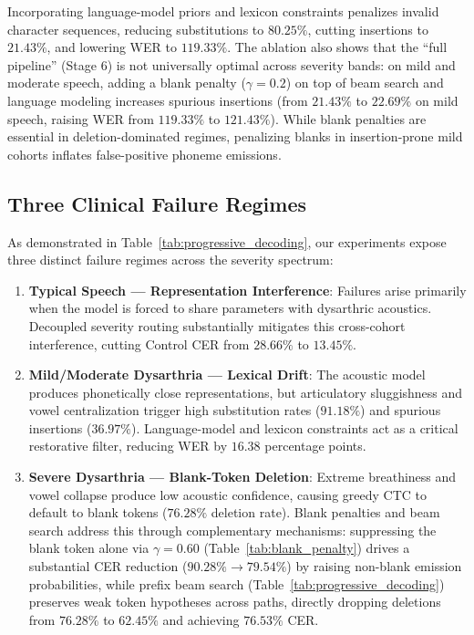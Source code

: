 \documentclass[10pt,twocolumn]{article}
\begin{document}
Incorporating language-model priors and lexicon constraints penalizes invalid character sequences, reducing substitutions to $80.25\%$, cutting insertions to $21.43\%$, and lowering WER to $\mathbf{119.33\%}$. The ablation also shows that the ``full pipeline'' (Stage 6) is not universally optimal across severity bands: on mild and moderate speech, adding a blank penalty ($\gamma=0.2$) on top of beam search and language modeling increases spurious insertions (from $21.43\%$ to $22.69\%$ on mild speech, raising WER from $119.33\%$ to $121.43\%$). While blank penalties are essential in deletion-dominated regimes, penalizing blanks in insertion-prone mild cohorts inflates false-positive phoneme emissions.

\subsection{Three Clinical Failure Regimes}

As demonstrated in Table~\ref{tab:progressive_decoding}, our experiments expose three distinct failure regimes across the severity spectrum:
\begin{enumerate}
    \item \textbf{Typical Speech --- Representation Interference}: Failures arise primarily when the model is forced to share parameters with dysarthric acoustics. Decoupled severity routing substantially mitigates this cross-cohort interference, cutting Control CER from $28.66\%$ to $\mathbf{13.45\%}$.
    \item \textbf{Mild/Moderate Dysarthria --- Lexical Drift}: The acoustic model produces phonetically close representations, but articulatory sluggishness and vowel centralization trigger high substitution rates ($91.18\%$) and spurious insertions ($36.97\%$). Language-model and lexicon constraints act as a critical restorative filter, reducing WER by $16.38$ percentage points.
    \item \textbf{Severe Dysarthria --- Blank-Token Deletion}: Extreme breathiness and vowel collapse produce low acoustic confidence, causing greedy CTC to default to blank tokens ($76.28\%$ deletion rate). Blank penalties and beam search address this through complementary mechanisms: suppressing the blank token alone via $\gamma=0.60$ (Table~\ref{tab:blank_penalty}) drives a substantial CER reduction ($90.28\% \to 79.54\%$) by raising non-blank emission probabilities, while prefix beam search (Table~\ref{tab:progressive_decoding}) preserves weak token hypotheses across paths, directly dropping deletions from $76.28\%$ to $\mathbf{62.45\%}$ and achieving $76.53\%$ CER.
\end{enumerate}
\end{document}
